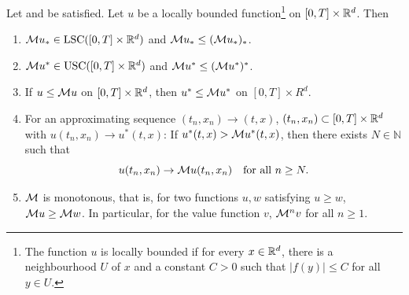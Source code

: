 \begin{lemma}
\label{lemma: Lemma 4.3 in Seydel}
    Let  and  be satisfied. Let $u$ be a locally bounded function\footnote{The function $u$ is locally bounded if for every $x \in \mathbb{R}^d$, there is a neighbourhood $U$ of $x$ and a constant $C>0$ such that $|f(y)| \leq C$ for all $y \in U$.} on $[0,T] \times \mathbb{R}^d$. Then
    \begin{enumerate}[label=(\roman*)]
        \item $\mathcal{M} u_* \in \operatorname{LSC} ([0,T] \times \mathbb{R}^d)$ and $\mathcal{M} u_* \leq (\mathcal{M} u_*)_*$.
        \item $\mathcal{M} u^* \in \operatorname{USC} ([0,T] \times \mathbb{R}^d)$ and $\mathcal{M} u^* \leq (\mathcal{M} u^*)^*$.
        \item If $u \leq \mathcal{M} u$ on $[0,T] \times \mathbb{R}^d$, then $u^* \leq \mathcal{M} u^*$ on $[0,T] \times R^d$.
        \item For an approximating sequence $(t_n,x_n) \rightarrow (t,x)$, $(t_n,x_n) \subset [0,T]\times \mathbb{R}^d$ with $u(t_n,x_n) \rightarrow u^*(t,x)$: \newline \indent If $u^*(t,x) > \mathcal{M} u^*(t,x)$, then there exists $N \in \mathbb N$ such that 
        \begin{equation*}
            u(t_n,x_n) \rightarrow \mathcal{M} u(t_n,x_n) \quad \text{for all } n \geq N.
        \end{equation*}
        \item $\mathcal{M}$ is monotonous, that is, for two functions $u,w$ satisfying $u \geq w$, $\mathcal{M} u \geq \mathcal{M} w$. In particular, for the value function $v$, $\mathcal{M}^n v$ for all $n \geq 1$. 
    \end{enumerate}
\end{lemma}
